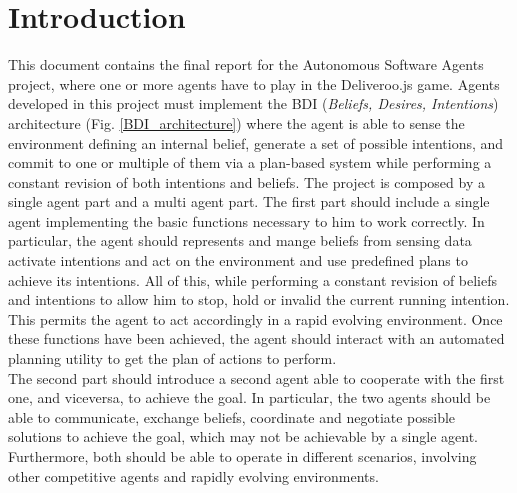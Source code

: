 \section{Introduction}
    This document contains the final report for the Autonomous Software Agents project, where one or more agents have to play in the Deliveroo.js game. Agents developed in this project must implement the BDI (\textit{Beliefs, Desires, Intentions}) architecture (Fig. \ref{BDI_architecture}) where the agent is able to sense the environment defining an internal belief, generate a set of possible intentions, and commit to one or multiple of them via a plan-based system while performing a constant revision of both intentions and beliefs.
    The project is composed by a single agent part and a multi agent part. The first part should include a single agent implementing the basic functions necessary to him to work correctly. In particular, the agent should represents and mange beliefs from sensing data activate intentions and act on the environment and use predefined plans to achieve its intentions. All of this, while performing a constant revision of beliefs and intentions to allow him to stop, hold or invalid the current running intention. This permits the agent to act accordingly in a rapid evolving environment. Once these functions have been achieved, the agent should interact with an automated planning utility to get the plan of actions to perform.
    \medskip\\
    The second part should introduce a second agent able to cooperate with the first one, and viceversa, to achieve the goal. In particular, the two agents should be able to communicate, exchange beliefs, coordinate and negotiate possible solutions to achieve the goal, which may not be achievable by a single agent.
    \medskip\\
    Furthermore, both should be able to operate in different scenarios, involving other competitive agents and rapidly evolving environments.
